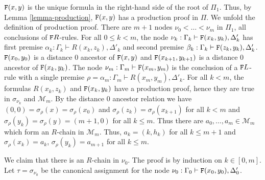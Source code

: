 \documentclass[a4paper,12pt]{article}
\newenvironment{proof}[1][Proof]{\begin{trivlist}
\item[\hskip \labelsep {\bfseries #1}]}{\end{trivlist}}
\newcommand{\setM}              { {\mathcal M} }
\newcommand{\Forward}         { {\tt F} }
\newcommand{\range}           { {\tt range} }
\begin{document}
\begin{proof}
$\Forward(x,y)$ is the unique formula in the right-hand side of the root of $\Pi_1$. Thus, by Lemma \ref{lemma-production}, $\Forward(x,y)$ has a production proof in $\Pi$. We unfold the definition of production proof. There are $m+1$ nodes $\nu_0 < \ldots < \nu_{m}$ in $\Pi_1$, all conclusions of $\Forward R$-rules. For all $0 \le k<m$, the node $\nu_k:\Gamma_k \vdash \Forward(x_k,y_k), \Delta'_k$ has first premise $\alpha_k:\Gamma_k \vdash R(x_k,z_k), \Delta'_k$ and second premise $\beta_k:\Gamma_k \vdash \Forward(z_k,y_k), \Delta'_k$. $\Forward(x_0,y_0)$ is a distance $0$ ancestor of $\Forward(x,y)$ and $\Forward(x_{k+1},y_{k+1})$ is a distance $0$ ancestor of $\Forward(x_k,y_k)$. The node $\nu_{m}:\Gamma_m \vdash \Forward(x_m,y_m)$ is the conclusion of a $\Forward L$-rule with a single premise $\rho = \alpha_m : \Gamma_m \vdash R(x_{m},y_{m}), \Delta'_k$. For all $k<m$, the formulas $R(x_k,z_k)$ and $\Forward(x_k,y_k)$ have a production proof, hence they are true in $\sigma_{\nu_k}$ and $\setM_m$. By the distance $0$ ancestor relation we have $(0,0) = \sigma_\rho(x) = \sigma_\rho(x_0)$ and $\sigma_\rho(z_k) = \sigma_\rho(x_{k+1})$ for all $k<m$ and $\sigma_\rho(y_k) = \sigma_\rho(y) = (m+1,0)$ for all $k \le m$. Thus there are $a_0, \ldots, a_m \in \setM_m$ which form an $R$-chain in $\setM_m$. Thus, $a_k=(k,h_k)$ for all $k\le m+1$ and $\sigma_\rho(x_k) = a_k$, $\sigma_\rho(y_k) = a_{m+1}$ for all $k \le m$. 

We claim that there is an $R$-chain in $\nu_0$. The proof is by induction on $k \in [0,m]$. Let $\tau = \sigma_{\nu_0}$ be the canonical assignment for the node $\nu_0: \Gamma_0 \vdash \Forward(x_0, y_0), \Delta'_0$. 



\end{proof}
\end{document}
